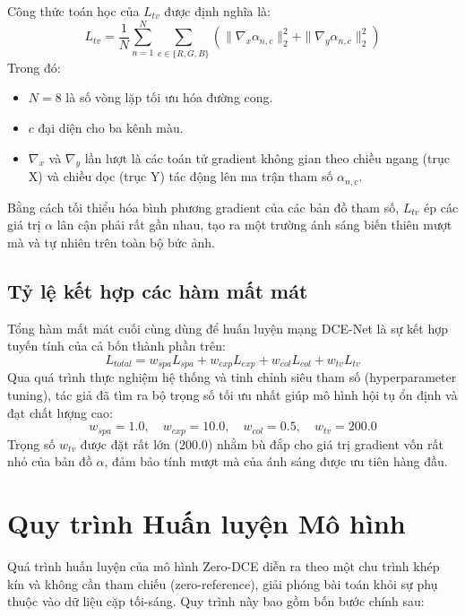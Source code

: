 \documentclass[a4paper]{article}
\begin{document}
Công thức toán học của $L_{tv}$ được định nghĩa là:
\begin{equation}
    L_{tv} = \frac{1}{N} \sum_{n=1}^{N} \sum_{c \in \{R,G,B\}} \left( \| \nabla_x \alpha_{n,c} \|_2^2 + \| \nabla_y \alpha_{n,c} \|_2^2 \right)
\end{equation}
Trong đó:
\begin{itemize}
    \item $N=8$ là số vòng lặp tối ưu hóa đường cong.
    \item $c$ đại diện cho ba kênh màu.
    \item $\nabla_x$ và $\nabla_y$ lần lượt là các toán tử gradient không gian theo chiều ngang (trục X) và chiều dọc (trục Y) tác động lên ma trận tham số $\alpha_{n,c}$.
\end{itemize}
Bằng cách tối thiểu hóa bình phương gradient của các bản đồ tham số, $L_{tv}$ ép các giá trị $\alpha$ lân cận phải rất gần nhau, tạo ra một trường ánh sáng biến thiên mượt mà và tự nhiên trên toàn bộ bức ảnh.

\subsection{Tỷ lệ kết hợp các hàm mất mát}
Tổng hàm mất mát cuối cùng dùng để huấn luyện mạng DCE-Net là sự kết hợp tuyến tính của cả bốn thành phần trên:
\begin{equation}
    L_{total} = w_{spa}L_{spa} + w_{exp}L_{exp} + w_{col}L_{col} + w_{tv}L_{tv}
\end{equation}
Qua quá trình thực nghiệm hệ thống và tinh chỉnh siêu tham số (hyperparameter tuning), tác giả đã tìm ra bộ trọng số tối ưu nhất giúp mô hình hội tụ ổn định và đạt chất lượng cao:
\begin{equation}
    w_{spa} = 1.0, \quad w_{exp} = 10.0, \quad w_{col} = 0.5, \quad w_{tv} = 200.0
\end{equation}
\noindent Trọng số $w_{tv}$ được đặt rất lớn ($200.0$) nhằm bù đắp cho giá trị gradient vốn rất nhỏ của bản đồ $\alpha$, đảm bảo tính mượt mà của ánh sáng được ưu tiên hàng đầu.

\clearpage

\section{Quy trình Huấn luyện Mô hình}
Quá trình huấn luyện của mô hình Zero-DCE diễn ra theo một chu trình khép kín và không cần tham chiếu (zero-reference), giải phóng bài toán khỏi sự phụ thuộc vào dữ liệu cặp tối-sáng. Quy trình này bao gồm bốn bước chính sau:
\end{document}
